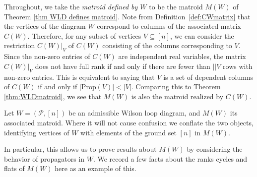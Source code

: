 \documentclass[11pt]{article}
\newcommand{\cP}{\mathcal{P}}
\newcommand{\Prop}{\textrm{Prop}}
\theoremstyle{remark}
\theoremstyle{definition}
\begin{document}
Throughout, we take the {\em matroid defined by $W$} to be the matroid $M(W)$ of Theorem \ref{thm WLD defines matroid}. Note from Definition~\ref{def:CWmatrix} that the vertices of the diagram $W$ correspond to columns of the associated matrix $C(W)$. Therefore, for any subset of vertices $V \subseteq [n]$, we can consider the restriction $C(W)|_V$ of $C(W)$ consisting of the columns corresponding to $V$. Since the non-zero entries of $C(W)$ are independent real variables, the matrix $C(W)|_V$ does not have full rank if and only if there are fewer than $||V$ rows with non-zero entries. This is equivalent to saying that $V$ is a set of dependent columns of $C(W)$ if and only if $|\Prop(V)| < |V|$. Comparing this to Theorem \ref{thm:WLDmatroid}, we see that $M(W)$ is also the matroid realized by $C(W)$.




Let $W = (\cP,[n])$ be an admissible Wilson loop diagram, and $M(W)$ its associated matroid. Where it will not cause confusion we conflate the two objects, identifying vertices of $W$ with elements of the ground set $[n]$ in $M(W)$. 

In particular, this allows us to prove results about $M(W)$ by considering the behavior of propagators in $W$. We record a few facts about the ranks cycles and flats of $M(W)$ here as an example of this.
\end{document}
